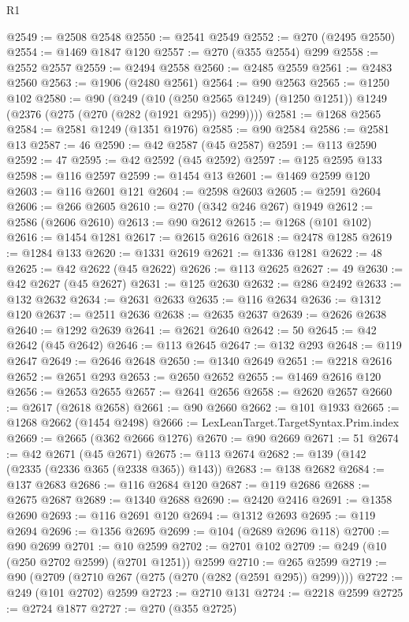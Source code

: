 \begin{lexlean}{R1}
\begin{coremodule}
@2549 := @2508 @2548
@2550 := @2541 @2549
@2552 := @270 (@2495 @2550)
@2554 := @1469 @1847 @120
@2557 := @270 (@355 @2554) @299
@2558 := @2552 @2557
@2559 := @2494 @2558
@2560 := @2485 @2559
@2561 := @2483 @2560
@2563 := @1906 (@2480 @2561)
@2564 := @90 @2563
@2565 := @1250 @102
@2580 := @90
    (@249
      (@10 (@250 @2565 @1249) (@1250 @1251))
      @1249
      (@2376 (@275 (@270 (@282 (@1921 @295)) @299))))
@2581 := @1268 @2565
@2584 := @2581 @1249 (@1351 @1976)
@2585 := @90 @2584
@2586 := @2581 @13
@2587 := 46
@2590 := @42 @2587 (@45 @2587)
@2591 := @113 @2590
@2592 := 47
@2595 := @42 @2592 (@45 @2592)
@2597 := @125 @2595 @133
@2598 := @116 @2597
@2599 := @1454 @13
@2601 := @1469 @2599 @120
@2603 := @116 @2601 @121
@2604 := @2598 @2603
@2605 := @2591 @2604
@2606 := @266 @2605
@2610 := @270 (@342 @246 @267) @1949
@2612 := @2586 (@2606 @2610)
@2613 := @90 @2612
@2615 := @1268 (@101 @102)
@2616 := @1454 @1281
@2617 := @2615 @2616
@2618 := @2478 @1285
@2619 := @1284 @133
@2620 := @1331 @2619
@2621 := @1336 @1281
@2622 := 48
@2625 := @42 @2622 (@45 @2622)
@2626 := @113 @2625
@2627 := 49
@2630 := @42 @2627 (@45 @2627)
@2631 := @125 @2630
@2632 := @286 @2492
@2633 := @132 @2632
@2634 := @2631 @2633
@2635 := @116 @2634
@2636 := @1312 @120
@2637 := @2511 @2636
@2638 := @2635 @2637
@2639 := @2626 @2638
@2640 := @1292 @2639
@2641 := @2621 @2640
@2642 := 50
@2645 := @42 @2642 (@45 @2642)
@2646 := @113 @2645
@2647 := @132 @293
@2648 := @119 @2647
@2649 := @2646 @2648
@2650 := @1340 @2649
@2651 := @2218 @2616
@2652 := @2651 @293
@2653 := @2650 @2652
@2655 := @1469 @2616 @120
@2656 := @2653 @2655
@2657 := @2641 @2656
@2658 := @2620 @2657
@2660 := @2617 (@2618 @2658)
@2661 := @90 @2660
@2662 := @101 @1933
@2665 := @1268 @2662 (@1454 @2498)
@2666 := LexLeanTarget.TargetSyntax.Prim.index
@2669 := @2665 (@362 @2666 @1276)
@2670 := @90 @2669
@2671 := 51
@2674 := @42 @2671 (@45 @2671)
@2675 := @113 @2674
@2682 := @139 (@142 (@2335 (@2336 @365 (@2338 @365)) @143))
@2683 := @138 @2682
@2684 := @137 @2683
@2686 := @116 @2684 @120
@2687 := @119 @2686
@2688 := @2675 @2687
@2689 := @1340 @2688
@2690 := @2420 @2416
@2691 := @1358 @2690
@2693 := @116 @2691 @120
@2694 := @1312 @2693
@2695 := @119 @2694
@2696 := @1356 @2695
@2699 := @104 (@2689 @2696 @118)
@2700 := @90 @2699
@2701 := @10 @2599
@2702 := @2701 @102
@2709 := @249 (@10 (@250 @2702 @2599) (@2701 @1251)) @2599
@2710 := @265 @2599
@2719 := @90 (@2709 (@2710 @267 (@275 (@270 (@282 (@2591 @295)) @299))))
@2722 := @249 (@101 @2702) @2599
@2723 := @2710 @131
@2724 := @2218 @2599
@2725 := @2724 @1877
@2727 := @270 (@355 @2725)

\end{coremodule}
\end{lexlean}
